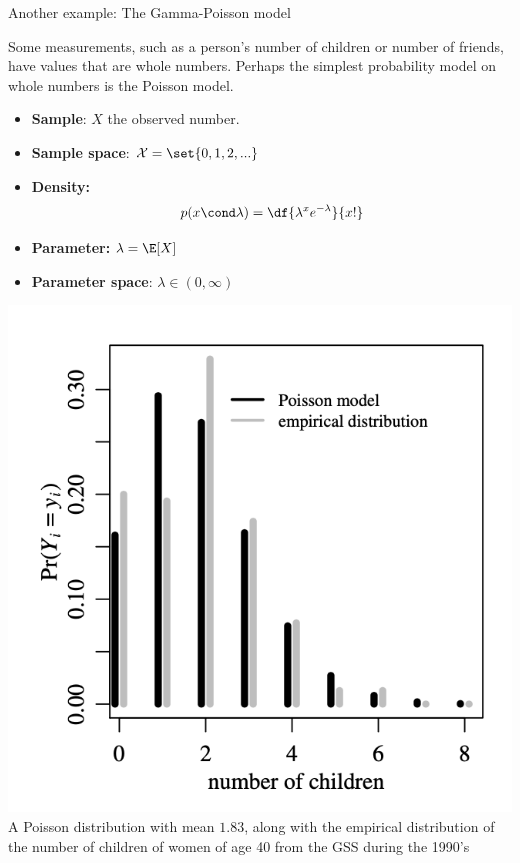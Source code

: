 \documentclass[10pt]{beamer}
\begin{document}
\begin{frame}{Another example: The Gamma-Poisson model}

Some measurements, such as a person's number of children or number of friends, have values that are whole numbers.    Perhaps the simplest probability model on whole numbers is the Poisson model.

\begin{minipage}{.48\textwidth}
\begin{itemize}
\item \textbf{Sample}: $X$ the observed number.
\item \textbf{Sample space}: $\mathcal{X} = \set{0,1,2,...}$
\item \textbf{Density:}
\begin{equation}
p(x \cond \lambda) = \df{\lambda^x e^{-\lambda}}{x!} 
\label{eqn:poisson_density}	 
\end{equation}

 \item \textbf{Parameter:} $\lambda = \E[X]$
\item \textbf{Parameter space}: $\lambda \in (0,\infty)$ 

\end{itemize}
\end{minipage} \hfill 
\begin{minipage}{.48\textwidth}

\begin{center}
\includegraphics[width=\textwidth]{images/hoff_poisson}	
\scriptsize A Poisson distribution with mean $1.83$, along with the empirical distribution of the number of children of women of age 40 from the GSS during the 1990's
\end{center}

\end{minipage} 


\end{frame}
\end{document}

